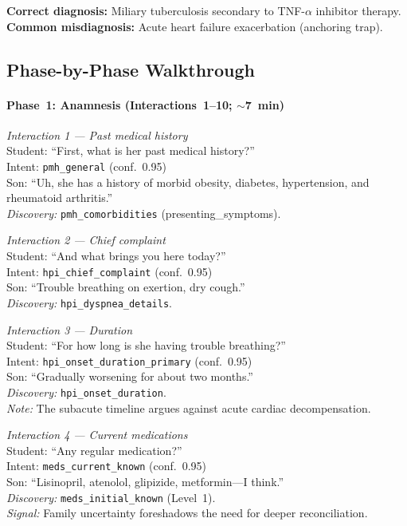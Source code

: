 \noindent\textbf{Correct diagnosis:} Miliary tuberculosis secondary to TNF-$\alpha$ inhibitor therapy. \\
\textbf{Common misdiagnosis:} Acute heart failure exacerbation (anchoring trap).

\subsection{Phase-by-Phase Walkthrough}

\paragraph{Phase~1: Anamnesis (Interactions~1--10; \(\sim\)7~min)}
\textit{Interaction 1 --- Past medical history} \\
Student: ``First, what is her past medical history?'' \\
Intent: \texttt{pmh\_general} (conf.~0.95) \\
Son: ``Uh, she has a history of morbid obesity, diabetes, hypertension, and rheumatoid arthritis.'' \\
\emph{Discovery:} \texttt{pmh\_comorbidities} (presenting\_symptoms).

\smallskip
\textit{Interaction 2 --- Chief complaint} \\
Student: ``And what brings you here today?'' \\
Intent: \texttt{hpi\_chief\_complaint} (conf.~0.95) \\
Son: ``Trouble breathing on exertion, dry cough.'' \\
\emph{Discovery:} \texttt{hpi\_dyspnea\_details}.

\smallskip
\textit{Interaction 3 --- Duration} \\
Student: ``For how long is she having trouble breathing?'' \\
Intent: \texttt{hpi\_onset\_duration\_primary} (conf.~0.95) \\
Son: ``Gradually worsening for about two months.'' \\
\emph{Discovery:} \texttt{hpi\_onset\_duration}. \\
\emph{Note:} The subacute timeline argues against acute cardiac decompensation.

\smallskip
\textit{Interaction 4 --- Current medications} \\
Student: ``Any regular medication?'' \\
Intent: \texttt{meds\_current\_known} (conf.~0.95) \\
Son: ``Lisinopril, atenolol, glipizide, metformin---I think.'' \\
\emph{Discovery:} \texttt{meds\_initial\_known} (Level~1). \\
\emph{Signal:} Family uncertainty foreshadows the need for deeper reconciliation.

